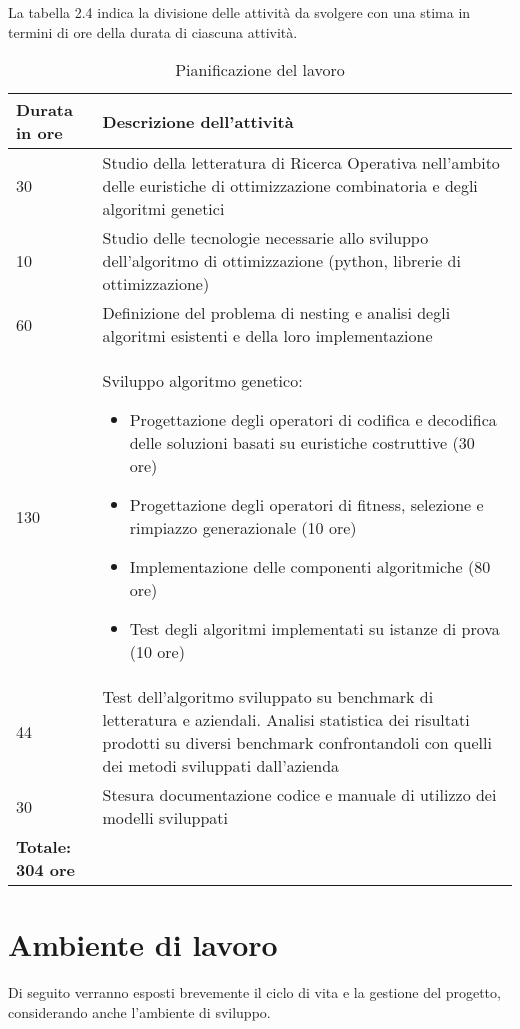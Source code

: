La tabella 2.4 indica la divisione delle attività da svolgere con una stima in termini di ore della durata di ciascuna attività.\\

\begin{table}[H]
\centering
\begin{tabular}{|l|p{10cm}|}
\hline
\textbf{Durata in ore} & \textbf{Descrizione dell'attività} \\ \hline
30 & Studio della letteratura di Ricerca Operativa nell’ambito delle euristiche di ottimizzazione combinatoria e degli algoritmi genetici \\ \hline
10 & Studio delle tecnologie necessarie allo sviluppo dell’algoritmo di ottimizzazione (python, librerie di ottimizzazione) \\ \hline
60 & Definizione del problema di nesting e analisi degli algoritmi esistenti e della loro implementazione \\ \hline
130 & Sviluppo algoritmo genetico:
\begin{itemize}
    \item Progettazione degli operatori di codifica e decodifica delle soluzioni basati su euristiche costruttive (30 ore)
    \item Progettazione degli operatori di fitness, selezione e rimpiazzo generazionale (10 ore)
    \item Implementazione delle componenti algoritmiche (80 ore)
    \item Test degli algoritmi implementati su istanze di prova (10 ore)
\end{itemize} \\ \hline
44 & Test dell'algoritmo sviluppato su benchmark di letteratura e aziendali. Analisi statistica dei risultati prodotti su diversi benchmark confrontandoli con quelli dei metodi sviluppati dall'azienda \\ \hline
30 & Stesura documentazione codice e manuale di utilizzo dei modelli sviluppati \\ \hline
\textbf{Totale: 304 ore} & \\ \hline
\end{tabular}
\caption{Pianificazione del lavoro}
\end{table}

\section{Ambiente di lavoro}

Di seguito verranno esposti brevemente il ciclo di vita e la gestione del progetto, considerando anche l'ambiente di sviluppo.
